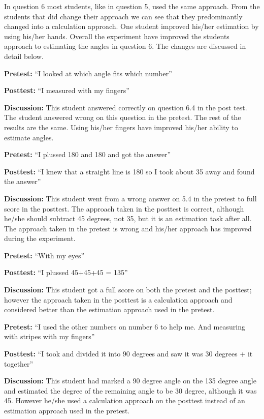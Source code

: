 \bigskip\noindent
In question 6 most students, like in question 5, used the same approach. From the students that did change their approach we can see that they predominantly changed into a calculation approach. One student improved his/her estimation by using his/her hands. Overall the experiment have improved the students approach to estimating the angles in question 6. The changes are discussed in detail below. 

\bigskip\noindent
\textbf{Pretest:} ``I looked at which angle fits which number''
\par\noindent \textbf{Posttest:} ``I measured with my fingers''
\par\noindent \textbf{Discussion:} This student answered correctly on question 6.4 in the post test. The student answered wrong on this question in the pretest. The rest of the results are the same. Using his/her fingers have improved his/her ability to estimate angles. 

\bigskip\noindent
\textbf{Pretest:} ``I plussed 180 and 180 and got the answer''
\par\noindent \textbf{Posttest:} ``I knew that a straight line is 180 so I took about 35 away and found the answer''
\par\noindent \textbf{Discussion:} This student went from a wrong answer on 5.4 in the pretest to full score in the posttest. The approach taken in the posttest is correct, although he/she should subtract 45 degrees, not 35, but it is an estimation task after all. The approach taken in the pretest is wrong and his/her approach has improved during the experiment.

\bigskip\noindent
\textbf{Pretest:} ``With my eyes''
\par\noindent \textbf{Posttest:} ``I plussed 45+45+45 = 135''
\par\noindent \textbf{Discussion:} This student got a full score on both the pretest and the posttest; however the approach taken in the posttest is a calculation approach and considered better than the estimation approach used in the pretest.

\bigskip\noindent
\textbf{Pretest:} ``I used the other numbers on number 6 to help me. And measuring with stripes with my fingers''
\par\noindent \textbf{Posttest:} ``I took and divided it into 90 degrees and saw it was 30 degrees + it together''
\par\noindent \textbf{Discussion:} This student had marked a 90 degree angle on the 135 degree angle and estimated the degree of the remaining angle to be 30 degree, although it was 45. However he/she used a calculation approach on the posttest instead of an estimation approach used in the pretest.

